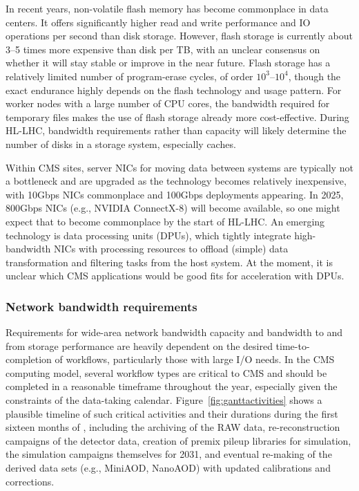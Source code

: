 In recent years, non-volatile flash memory has become commonplace in data centers. It offers significantly higher read and write performance and \gls{IO} operations per second than disk storage. However, flash storage is currently about 3--5 times more expensive than disk per TB, with an unclear consensus on whether it will stay stable or improve in the near future. Flash storage has a relatively limited number of program-erase cycles, of order $10^3$--$10^4$, though the exact endurance highly depends on the flash technology and usage pattern. For worker nodes with a large number of \gls{CPU} cores, the bandwidth required for temporary files makes the use of flash storage already more cost-effective. During \gls{HL-LHC}, bandwidth requirements rather than capacity will likely determine the number of disks in a storage system, especially caches.

Within CMS sites, server \glspl{NIC} for moving data between systems are typically not a bottleneck and are upgraded as the technology becomes relatively inexpensive, with 10\unit{Gbps} \glspl{NIC} commonplace and 100\unit{Gbps} deployments appearing. In 2025, 800\unit{Gbps} \glspl{NIC} (e.g., NVIDIA ConnectX-8) will become available, so one might expect that to become commonplace by the start of \gls{HL-LHC}. An emerging technology is data processing units (DPUs), which tightly integrate high-bandwidth \glspl{NIC} with processing resources to offload (simple) data transformation and filtering tasks from the host system. At the moment, it is unclear which CMS applications would be good fits for acceleration with DPUs.

\subsubsection{Network bandwidth requirements}

Requirements for wide-area network bandwidth capacity and bandwidth to and from storage performance are heavily dependent on the desired time-to-completion of workflows, particularly those with large I/O needs. In the CMS computing model, several workflow types are critical to CMS and should be completed in a reasonable timeframe throughout the year, especially given the constraints of the data-taking calendar. Figure~\ref{fig:ganttactivities} shows a plausible timeline of such critical activities and their durations during the first sixteen months of \RunFour, including the archiving of the \gls{RAW} data, re-reconstruction campaigns of the detector data, creation of premix pileup libraries for simulation, the simulation campaigns themselves for 2031, and eventual re-making of the derived data sets (e.g., MiniAOD, NanoAOD) with updated calibrations and corrections. 


